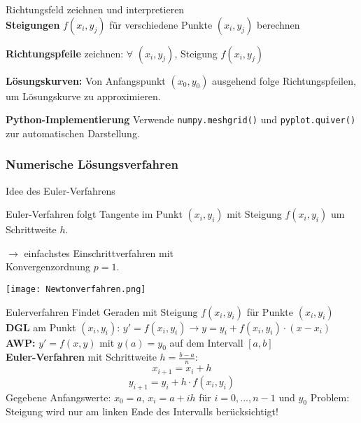 \begin{KR}{Richtungsfeld zeichnen und interpretieren}\\
\textbf{Steigungen} $f(x_i, y_j)$ für verschiedene Punkte $(x_i, y_j)$ berechnen

\textbf{Richtungspfeile} zeichnen: $\forall$ $(x_i, y_j)$, Steigung $f(x_i, y_j)$

\textbf{Lösungskurven:}
Von Anfangspunkt $(x_0, y_0)$ ausgehend folge Richtungspfeilen, um Lösungskurve zu approximieren.

\small
\textbf{Python-Implementierung}
Verwende \texttt{numpy.meshgrid()} und \texttt{pyplot.quiver()} zur automatischen Darstellung.
\end{KR}

\subsubsection{Numerische Lösungsverfahren}

\begin{definition}{Idee des Euler-Verfahrens}

\begin{minipage}{0.69\linewidth}
Euler-Verfahren folgt Tangente im Punkt $(x_i, y_i)$ mit Steigung $f(x_i, y_i)$ um Schrittweite $h$. 

$\rightarrow$ einfachstes Einschrittverfahren mit\\ Konvergenzordnung $p = 1$.
\end{minipage}
\begin{minipage}{0.3\linewidth}
  \begin{center}
    \texttt{[image: Newtonverfahren.png]}
    \end{center}
\end{minipage}
\end{definition}

\begin{concept}{Eulerverfahren}
  \small
  Findet Geraden mit Steigung $f(x_i,y_i)$ für Punkte $(x_i,y_i)$
  \vspace{1mm}\\ 
  \normalsize
  \textbf{DGL} am Punkt $(x_i,y_i)$: $y'=f(x_i,y_i) \rightarrow y=y_i+f(x_i,y_i)\cdot (x-x_i)$
  \vspace{1mm}\\
  \textbf{AWP:} $y' = f(x,y)$ mit $y(a) = y_0$ auf dem Intervall $[a,b]$
  \vspace{1mm}\\
  \textbf{Euler-Verfahren} mit Schrittweite $h = \frac{b-a}{n}$:
  $$x_{i+1} = x_i + h$$
  $$y_{i+1} = y_i + h \cdot f(x_i, y_i)$$
  Gegebene Anfangswerte: $x_0 = a$, $x_i = a + ih$ für $i = 0, ..., n-1$ und $y_0$
  \small
  Problem: Steigung wird nur am linken Ende des Intervalls berücksichtigt! 
\end{concept}

